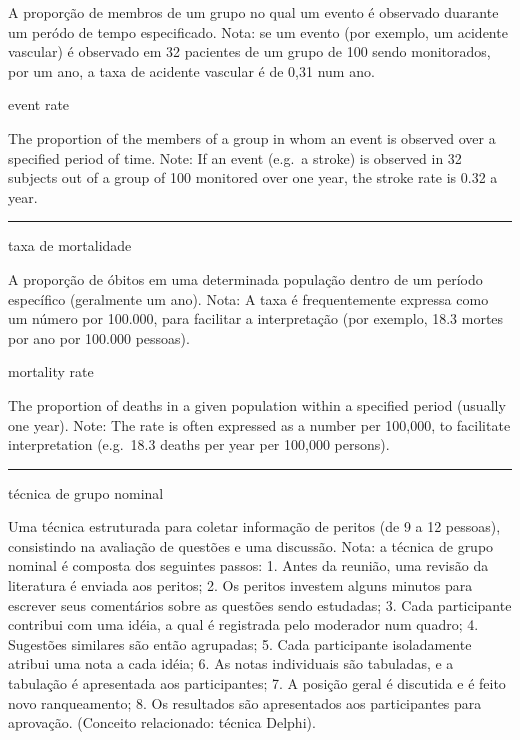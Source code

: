 \documentclass[
]{book}
\begin{document}
A proporção de membros de um grupo no qual um evento é observado duarante um peródo de tempo especificado. Nota: se um evento (por exemplo, um acidente vascular) é observado em 32 pacientes de um grupo de 100 sendo monitorados, por um ano, a taxa de acidente vascular é de 0,31 num ano.

event rate

The proportion of the members of a group in whom an event is observed over a specified period of time. Note: If an event (e.g.~a stroke) is observed in 32 subjects out of a group of 100 monitored over one year, the stroke rate is 0.32 a year.

\begin{center}\rule{0.5\linewidth}{0.5pt}\end{center}

taxa de mortalidade

A proporção de óbitos em uma determinada população dentro de um período específico (geralmente um ano). Nota: A taxa é frequentemente expressa como um número por 100.000, para facilitar a interpretação (por exemplo, 18.3 mortes por ano por 100.000 pessoas).

mortality rate

The proportion of deaths in a given population within a specified period (usually one year). Note: The rate is often expressed as a number per 100,000, to facilitate interpretation (e.g.~18.3 deaths per year per 100,000 persons).

\begin{center}\rule{0.5\linewidth}{0.5pt}\end{center}

técnica de grupo nominal

Uma técnica estruturada para coletar informação de peritos (de 9 a 12 pessoas), consistindo na avaliação de questões e uma discussão. Nota: a técnica de grupo nominal é composta dos seguintes passos: 1. Antes da reunião, uma revisão da literatura é enviada aos peritos; 2. Os peritos investem alguns minutos para escrever seus comentários sobre as questões sendo estudadas; 3. Cada participante contribui com uma idéia, a qual é registrada pelo moderador num quadro; 4. Sugestões similares são então agrupadas; 5. Cada participante isoladamente atribui uma nota a cada idéia; 6. As notas individuais são tabuladas, e a tabulação é apresentada aos participantes; 7. A posição geral é discutida e é feito novo ranqueamento; 8. Os resultados são apresentados aos participantes para aprovação. (Conceito relacionado: técnica Delphi).
\end{document}
